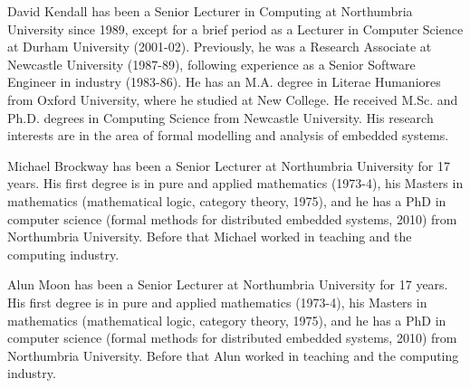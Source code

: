 \documentclass{ieeeaccess}
\begin{document}
\begin{IEEEbiography}{David Kendall}
has been a Senior Lecturer in Computing at Northumbria University since 1989, except for a brief period as a Lecturer in Computer Science at Durham University (2001-02). Previously, he was a Research Associate at Newcastle University (1987-89), following experience as a Senior Software Engineer in industry (1983-86). He has an M.A. degree in Literae Humaniores from Oxford University, where he studied at New College. He received M.Sc. and Ph.D. degrees in Computing Science from Newcastle University. His research interests are in the area of formal modelling and analysis of embedded systems. 
\end{IEEEbiography}

\begin{IEEEbiography}{Michael Brockway}
has been a Senior Lecturer at Northumbria University for 17 years. His first degree is in pure and applied mathematics (1973-4), his Masters in mathematics (mathematical logic, category theory, 1975), and he has a PhD in computer science (formal methods for distributed embedded systems, 2010) from Northumbria University. Before that Michael worked in teaching and the computing industry.
\end{IEEEbiography}

\begin{IEEEbiography}{Alun Moon}
  has been a Senior Lecturer at Northumbria University for 17 years. His first degree is in pure and applied mathematics (1973-4), his Masters in mathematics (mathematical logic, category theory, 1975), and he has a PhD in computer science (formal methods for distributed embedded systems, 2010) from Northumbria University. Before that Alun worked in teaching and the computing industry.
  \end{IEEEbiography}  
  
\EOD
\end{document}
